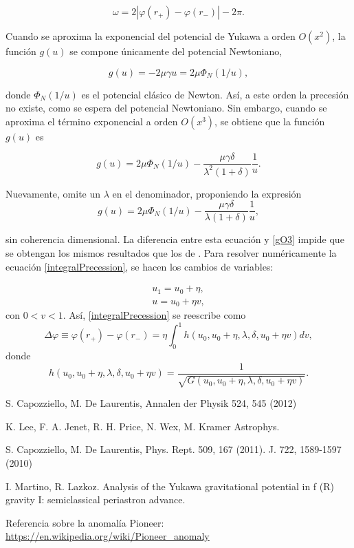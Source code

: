 \documentclass{article}
\begin{document}
\begin{equation}\label{precession}
	\omega=2|\varphi(r_+)-\varphi(r_-)|-2\pi.
\end{equation}

Cuando se aproxima la exponencial del potencial de Yukawa a orden $O(x^2)$, la función $g(u)$ se compone únicamente del potencial Newtoniano,

\begin{equation}
	g(u)=-2\mu\gamma u=2\mu\Phi_N(1/u),
\end{equation}

donde $\Phi_N(1/u)$ es el potencial clásico de Newton. Así, a este orden la precesión no existe, como se espera del potencial Newtoniano. Sin embargo, cuando se aproxima el término exponencial a orden $O(x^3)$, se obtiene que la función $g(u)$ es

\begin{equation}\label{gO3}
	g(u)=2\mu\Phi_N(1/u)-\frac{\mu\gamma\delta}{\lambda^2(1+\delta)}\frac{1}{u}.
\end{equation}

Nuevamente, \cite{Capozziello} omite un $\lambda$ en el denominador, proponiendo la expresión
$$g(u)=2 \mu \Phi_{N}(1 / u)-\frac{\mu \gamma \delta}{\lambda(1+\delta)} \frac{1}{u},$$

sin coherencia dimensional. La diferencia entre esta ecuación y \eqref{gO3} impide que se obtengan los mismos resultados que los de \cite{Capozziello}. Para resolver numéricamente la ecuación \eqref{integralPrecession}, se hacen los cambios de variables:

\begin{gather*}
	u_1=u_0+\eta,\\
	u=u_0+\eta v,
\end{gather*}
con $0<v<1$. Así, \eqref{integralPrecession} se reescribe como
\begin{equation}
	\Delta\varphi\equiv\varphi(r_+)-\varphi(r_-)=\eta\int_{0}^{1}h(u_0, u_0+\eta,\lambda,\delta, u_0+\eta v)dv,
\end{equation}
donde
\begin{equation}
	h(u_0, u_0+\eta,\lambda,\delta, u_0+\eta v)=\frac{1}{\sqrt{G(u_0,u_0+\eta,\lambda,\delta,u_0+\eta v)}}.
\end{equation}
\begin{thebibliography}{9}
	 S. Capozziello, M. De Laurentis, Annalen der Physik 524, 545 (2012) 
	
	 K. Lee, F. A. Jenet, R. H. Price, N. Wex, M. Kramer Astrophys.
	
	 S. Capozziello, M. De Laurentis, Phys. Rept. 509, 167 (2011).
	J. 722, 1589-1597 (2010)
	
	 I. Martino, R. Lazkoz. Analysis of the Yukawa gravitational potential in f (R) gravity I: semiclassical periastron advance.
	
	 Referencia sobre la anomalía Pioneer: \url{https://en.wikipedia.org/wiki/Pioneer_anomaly}
\end{thebibliography}
\end{document}
